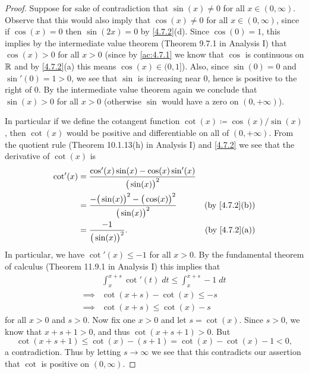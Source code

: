 \begin{proof}
  Suppose for sake of contradiction that \(\sin(x) \neq 0\) for all \(x \in (0, \infty)\).
  Observe that this would also imply that \(\cos(x) \neq 0\) for all \(x \in (0, \infty)\), since if \(\cos(x) = 0\) then \(\sin(2x) = 0\) by \cref{4.7.2}(d).
  Since \(\cos(0) = 1\), this implies by the intermediate value theorem (Theorem 9.7.1 in Analysis I) that \(\cos(x) > 0\) for all \(x > 0\)
  (since by \cref{ac:4.7.1} we know that \(\cos\) is continuous on \(\mathbb{R}\) and by \cref{4.7.2}(a) this means \(\cos(x) \in (0, 1]\)).
  Also, since \(\sin(0) = 0\) and \(\sin'(0) = 1 > 0\), we see that \(\sin\) is increasing near \(0\), hence is positive to the right of \(0\).
  By the intermediate value theorem again we conclude that \(\sin(x) > 0\) for all \(x > 0\)
  (otherwise \(\sin\) would have a zero on \((0, +\infty)\)).

  In particular if we define the cotangent function \(\cot(x) \coloneqq \cos(x) / \sin(x)\), then \(\cot(x)\) would be positive and differentiable on all of \((0, +\infty)\).
  From the quotient rule (Theorem 10.1.13(h) in Analysis I) and \cref{4.7.2} we see that the derivative of \(\cot(x)\) is
  \begin{align*}
    \cot'(x) & = \frac{\cos'(x) \sin(x) - \cos(x) \sin'(x)}{\big(\sin(x)\big)^2}                                      \\
             & = \frac{-\big(\sin(x)\big)^2 - \big(\cos(x)\big)^2}{\big(\sin(x)\big)^2} & \text{(by \cref{4.7.2}(b))} \\
             & = \frac{-1}{\big(\sin(x)\big)^2}.                                        & \text{(by \cref{4.7.2}(a))}
  \end{align*}
  In particular, we have \(\cot'(x) \leq -1\) for all \(x > 0\).
  By the fundamental theorem of calculus (Theorem 11.9.1 in Analysis I) this implies that
  \begin{align*}
             & \int_x^{x + s} \cot'(t) \; dt \leq \int_x^{x + s} -1 \; dt \\
    \implies & \cot(x + s) - \cot(x) \leq -s                              \\
    \implies & \cot(x + s) \leq \cot(x) - s
  \end{align*}
  for all \(x > 0\) and \(s > 0\).
  Now fix one \(x > 0\) and let \(s = \cot(x)\).
  Since \(s > 0\), we know that \(x + s + 1 > 0\), and thus \(\cot(x + s + 1) > 0\).
  But
  \[
    \cot(x + s + 1) \leq \cot(x) - (s + 1) = \cot(x) - \cot(x) - 1 < 0,
  \]
  a contradiction.
  Thus by letting \(s \to \infty\) we see that this contradicts our assertion that \(\cot\) is positive on \((0, \infty)\).
\end{proof}

